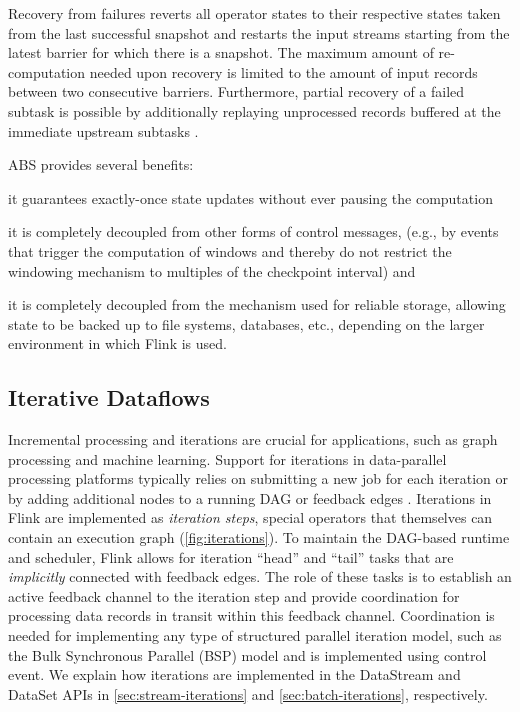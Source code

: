 \documentclass[11pt]{article}
\begin{document}
Recovery from failures reverts all operator states to their respective states taken from the last successful snapshot and restarts the input streams starting from the latest barrier for which there is a snapshot. The maximum amount of re-computation needed upon recovery is limited to the amount of input records between two consecutive barriers. Furthermore, partial recovery of a failed subtask is possible by additionally replaying unprocessed records  buffered at the immediate upstream subtasks \cite{carbone2015lightweight}.

\vspace{1mm}
\noindent ABS provides several benefits:
\begin{inparaenum}[i)]
\item it guarantees exactly-once state updates without ever pausing the computation
\item it is completely decoupled from other forms of control messages, (e.g., by events that trigger the computation of windows and thereby do not restrict the windowing mechanism to multiples of the checkpoint interval) and
\item it is completely decoupled from the mechanism used for reliable storage, allowing state to be backed up to file systems, databases, etc., depending on the larger environment in which Flink is used.
\end{inparaenum}

\vspace{-3mm}
\subsection{Iterative Dataflows}
\label{sec:iterations}
\vspace{-2mm}
Incremental processing and iterations are crucial for applications, such as graph processing and machine learning. Support for iterations in data-parallel processing platforms typically relies on submitting a new job for each iteration or by adding additional nodes to a running DAG \cite{DBLP:journals/pvldb/BuHBE10, DBLP:conf/hotcloud/ZahariaCFSS10} or feedback edges \cite{murray2013naiad}. Iterations in Flink are implemented as  \emph{iteration steps}, special operators that themselves can contain an execution graph (\autoref{fig:iterations}). To maintain the DAG-based runtime and scheduler, Flink allows for iteration ``head'' and ``tail'' tasks that are \emph{implicitly} connected with feedback edges. The role of these tasks is to establish an active feedback channel to the iteration step and provide coordination for processing data records in transit within this feedback channel. Coordination is needed for implementing any type of structured parallel iteration model, such as the Bulk Synchronous Parallel (BSP) model and is implemented using control event. We explain how iterations are implemented in the DataStream and DataSet APIs in \autoref{sec:stream-iterations} and  \autoref{sec:batch-iterations}, respectively. 
\end{document}
